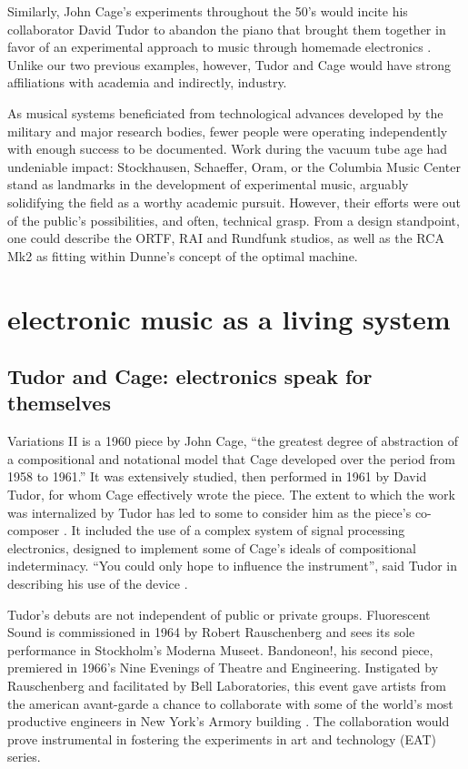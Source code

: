 Similarly, John Cage’s experiments throughout the 50’s would incite his collaborator David Tudor to abandon the piano that brought them together in favor of an experimental approach to music through homemade electronics \cite{holzaepfel1994,collins2004}. Unlike our two previous examples, however, Tudor and Cage would have strong affiliations with academia and indirectly, industry. 

As musical systems beneficiated from technological advances developed by the military and major research bodies, fewer people were operating independently with enough success to be documented. Work during the vacuum tube age had undeniable impact: Stockhausen, Schaeffer, Oram, or the Columbia Music Center stand as landmarks in the development of experimental music, arguably solidifying the field as a worthy academic pursuit. However, their efforts were out of the public's possibilities, and often, technical grasp. From a design standpoint, one could describe the ORTF, RAI and Rundfunk studios, as well as the RCA Mk2 as fitting within Dunne's concept of the optimal machine. 

\section{electronic music as a living system}

\subsection{Tudor and Cage: electronics speak for themselves}

	Variations II is a 1960 piece by John Cage, “the greatest degree of abstraction of a compositional and notational model that Cage developed over the period from 1958 to 1961.” It was extensively studied, then performed in 1961 by David Tudor, for whom Cage effectively wrote the piece. The extent to which the work was internalized by Tudor has led to some to consider him as the piece’s co-composer \cite{pritchett2004}. It included the use of a complex system of signal processing electronics, designed to implement some of Cage’s ideals of compositional indeterminacy. “You could only hope to influence the instrument”, said Tudor in describing his use of the device \cite{nakai2014}. 

Tudor’s debuts are not independent of public or private groups. Fluorescent Sound is commissioned in 1964 by Robert Rauschenberg and sees its sole performance in Stockholm’s Moderna Museet. Bandoneon!, his second piece, premiered in 1966’s Nine Evenings of Theatre and Engineering. Instigated by Rauschenberg and facilitated by Bell Laboratories, this event gave artists from the american avant-garde a chance to collaborate with some of the world’s most productive engineers in New York’s Armory building \cite{kuivila2004}. The collaboration would prove instrumental in fostering the experiments in art and technology (EAT) series. 
	
